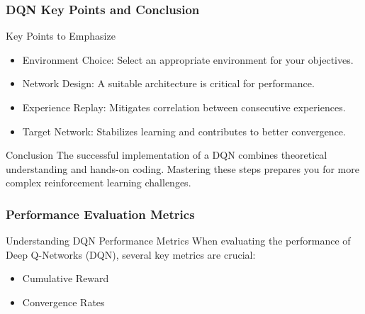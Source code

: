 \documentclass{beamer}
\begin{document}
\begin{frame}
    \frametitle{DQN Key Points and Conclusion}

    \begin{block}{Key Points to Emphasize}
        \begin{itemize}
            \item Environment Choice: Select an appropriate environment for your objectives.
            \item Network Design: A suitable architecture is critical for performance.
            \item Experience Replay: Mitigates correlation between consecutive experiences.
            \item Target Network: Stabilizes learning and contributes to better convergence.
        \end{itemize}
    \end{block}
    
    \begin{block}{Conclusion}
        The successful implementation of a DQN combines theoretical understanding and hands-on coding. Mastering these steps prepares you for more complex reinforcement learning challenges.
    \end{block}
\end{frame}

\begin{frame}[fragile]
    \frametitle{Performance Evaluation Metrics}
    \begin{block}{Understanding DQN Performance Metrics}
        When evaluating the performance of Deep Q-Networks (DQN), several key metrics are crucial:
        \begin{itemize}
            \item Cumulative Reward
            \item Convergence Rates
        \end{itemize}
    \end{block}
\end{frame}
\end{document}
